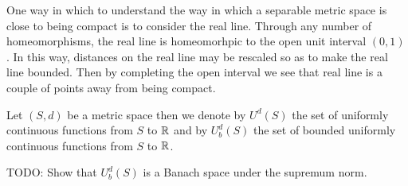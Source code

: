 One way in which to understand the way in which a separable metric space is close to being compact is to consider the real line.  Through any number of homeomorphisms, the real line is homeomorhpic to the open unit interval $(0,1)$.  In this way, distances on the real line may be rescaled so as to make the real line bounded.  Then by completing the open interval we see that real line is a couple of points away from being compact.

\begin{defn}Let $(S,d)$ be a metric space then we denote by $U^d(S)$ the set of uniformly continuous functions from $S$ to $\mathbb{R}$ and by $U_b^d(S)$ the set of bounded uniformly continuous functions from $S$ to $\mathbb{R}$.
\end{defn}
TODO: Show that $U^d_b(S)$ is a Banach space under the supremum norm.

